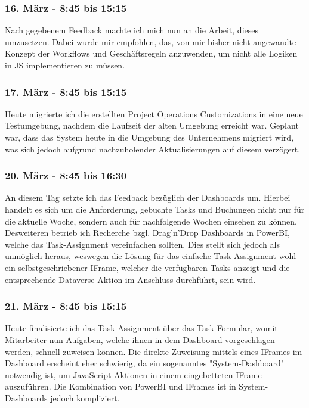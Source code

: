 \subsubsection*{16. März - 8:45 bis 15:15} 
Nach gegebenem Feedback machte ich mich nun an die Arbeit, dieses umzusetzen. Dabei wurde mir empfohlen, das, von mir bisher nicht angewandte Konzept der Workflows und Geschäftsregeln anzuwenden, um nicht alle Logiken in JS implementieren zu müssen.

\subsubsection*{17. März - 8:45 bis 15:15}
Heute migrierte ich die erstellten Project Operations Customizations in eine neue Testumgebung, nachdem die Laufzeit der alten Umgebung erreicht war. Geplant war, dass das System heute in die Umgebung des Unternehmens migriert wird, was sich jedoch aufgrund nachzuholender Aktualisierungen auf diesem verzögert.

\subsubsection*{20. März - 8:45 bis 16:30}
An diesem Tag setzte ich das Feedback bezüglich der Dashboards um. Hierbei handelt es sich um die Anforderung, gebuchte Tasks und Buchungen nicht nur für die aktuelle Woche, sondern auch für nachfolgende Wochen einsehen zu können. Desweiteren betrieb ich Recherche bzgl. Drag'n'Drop Dashboards in PowerBI, welche das Task-Assignment vereinfachen sollten. Dies stellt sich jedoch als unmöglich heraus, weswegen die Lösung für das einfache Task-Assignment wohl ein selbstgeschriebener IFrame, welcher die verfügbaren Tasks anzeigt und die entsprechende Dataverse-Aktion im Anschluss durchführt, sein wird.

\subsubsection*{21. März - 8:45 bis 15:15}
Heute finalisierte ich das Task-Assignment über das Task-Formular, womit Mitarbeiter nun Aufgaben, welche ihnen in dem Dashboard vorgeschlagen werden, schnell zuweisen können. Die direkte Zuweisung mittels eines IFrames im Dashboard erscheint eher schwierig, da ein sogenanntes "System-Dashboard" notwendig ist, um JavaScript-Aktionen in einem eingebetteten IFrame auszuführen. Die Kombination von PowerBI und IFrames ist in System-Dashboards jedoch kompliziert.

